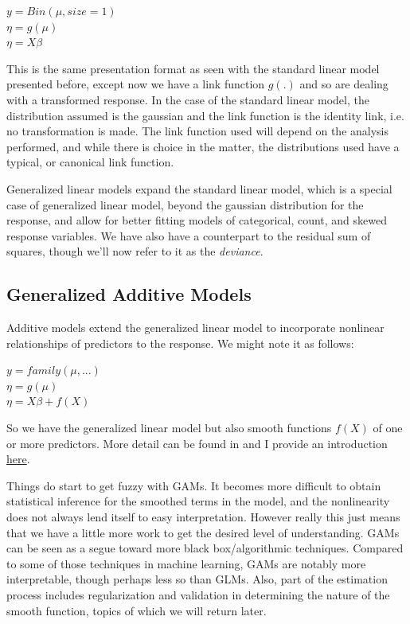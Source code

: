 \documentclass[english,nohyper,titlepage]{tufte-handout}\usepackage{knitr}
\begin{document}
\vspace{.25cm}
\noindent$y = Bin(\mu, size=1)$\\
\noindent$\eta = g(\mu)$\\
\noindent$\eta = X\beta$\\
\vspace{.25cm}

This is the same presentation format as seen with the standard linear model presented before, except now we have a link function $g(.)$ and so are dealing with a transformed response.  In the case of the standard linear model, the distribution assumed is the gaussian and the link function is the identity link, i.e. no transformation is made. The link function used will depend on the analysis performed, and while there is choice in the matter, the distributions used have a typical, or canonical link function.

Generalized linear models expand the standard linear model, which is a special case of generalized linear model, beyond the gaussian distribution for the response, and allow for better fitting models of categorical, count, and skewed response variables.  We have also have a counterpart to the residual sum of squares, though we'll now refer to it as the \emph{deviance}.

\subsection{Generalized Additive Models}
Additive models extend the generalized linear model to incorporate nonlinear relationships of predictors to the response. We might note it as follows:

\vspace{.25cm}
\noindent$y = family(\mu, ...)$\\
\noindent$\eta = g(\mu)$\\
\noindent$\eta = X\beta + f(X)$\\
\vspace{.25cm}

So we have the generalized linear model but also smooth functions $f(X)$ of one or more predictors.  More detail can be found in \citet{wood_generalized_2006} and I provide an introduction \href{http://www.nd.edu/~mclark19/learn/GAMS.pdf}{here}.  

Things do start to get fuzzy with GAMs.  It becomes more difficult to obtain statistical inference for the smoothed terms in the model, and the nonlinearity does not always lend itself to easy interpretation.  However really this just means that we have a little more work to get the desired level of understanding.  GAMs can be seen as a segue toward more black box/algorithmic techniques.  Compared to some of those techniques in machine learning, GAMs are notably more interpretable, though perhaps less so than GLMs.  Also, part of the estimation process includes regularization and validation in determining the nature of the smooth function, topics of which we will return later.
\end{document}

